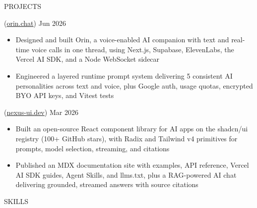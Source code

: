 \documentclass{resume}
\begin{document}
\begin{rSection}{PROJECTS}

 (\href{https://orin.chat/}{orin.chat}) \hfill Jun 2026
\begin{itemize}
    \itemsep -2.5pt {}
    \item Designed and built Orin, a voice-enabled AI companion with text and real-time voice calls in one thread, using Next.js, Supabase, ElevenLabs, the Vercel AI SDK, and a Node WebSocket sidecar
    \item Engineered a layered runtime prompt system delivering 5 consistent AI personalities across text and voice, plus Google auth, usage quotas, encrypted BYO API keys, and Vitest tests
\end{itemize}

 (\href{https://nexus-ui.dev/}{nexus-ui.dev}) \hfill Mar 2026
\begin{itemize}
    \itemsep -2.5pt {}
    \item Built an open-source React component library for AI apps on the shadcn/ui registry (100+ GitHub stars), with Radix and Tailwind v4 primitives for prompts, model selection, streaming, and citations
    \item Published an MDX documentation site with examples, API reference, Vercel AI SDK guides, Agent Skills, and llms.txt, plus a RAG-powered AI chat delivering grounded, streamed answers with source citations
\end{itemize}

\end{rSection}



\begin{rSection}{SKILLS}

\end{rSection}
\end{document}

